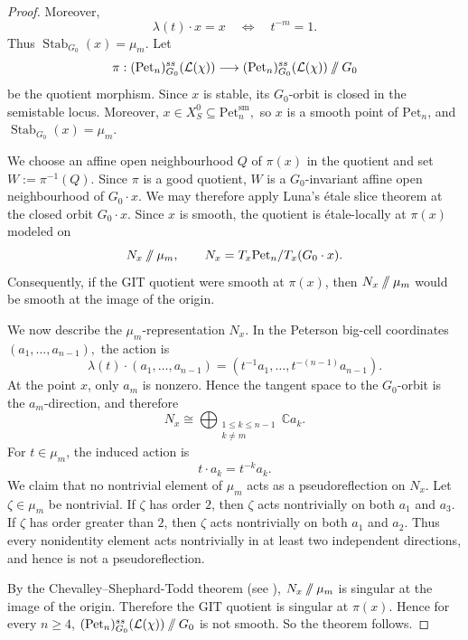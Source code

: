 \documentclass[12pt, reqno]{amsart}
\newcommand{\sslash}{\mathbin{/\mkern-6mu/}}
\theoremstyle{plain}
\numberwithin{equation}{section}
\theoremstyle{definition}
\begin{document}
\begin{proof}
Moreover,
\[
\lambda(t)\cdot x=x
\quad\Longleftrightarrow\quad
t^{-m}=1.
\]
Thus $
\operatorname{Stab}_{G_0}(x)=\mu_m.$ Let
\[
\pi:
(\mathrm{Pet}_n)^{ss}_{G_0}(\mathcal L(\chi))
\longrightarrow
(\mathrm{Pet}_n)^{ss}_{G_0}(\mathcal L(\chi))\sslash G_0
\]
be the quotient morphism. Since \(x\) is stable, its \(G_0\)-orbit is
closed in the semistable locus. Moreover, $x\in X_S^0\subseteq\mathrm{Pet}_n^{\mathrm{sm}},$
so \(x\) is a smooth point of \(\mathrm{Pet}_n\), and $\operatorname{Stab}_{G_0}(x)=\mu_m.$

We choose an affine open neighbourhood \(Q\) of \(\pi(x)\) in the
quotient and set $W:=\pi^{-1}(Q).$
Since \(\pi\) is a good quotient, \(W\) is a \(G_0\)-invariant affine
open neighbourhood of \(G_0\cdot x\). We may therefore apply Luna's
\'etale slice theorem \cite{Luna} at the closed orbit \(G_0\cdot x\).
Since \(x\) is smooth, the quotient is \'etale-locally at \(\pi(x)\)
modeled on
\[
N_x\sslash\mu_m,
\qquad
N_x=
T_x\mathrm{Pet}_n/T_x(G_0\cdot x).
\]
Consequently, if the GIT quotient were smooth at \(\pi(x)\), then
\(N_x\sslash\mu_m\) would be smooth at the image of the origin.

We now describe the $\mu_m$-representation $N_x$. 
In the Peterson big-cell coordinates $(a_1,\ldots,a_{n-1}),$
the action is
\[
\lambda(t)\cdot(a_1,\ldots,a_{n-1})
=
(t^{-1}a_1,\ldots,t^{-(n-1)}a_{n-1}).
\]
At the point \(x\), only \(a_m\) is nonzero. Hence the tangent space
to the \(G_0\)-orbit is the \(a_m\)-direction, and therefore
\[
N_x
\cong
\bigoplus_{\substack{1\le k\le n-1\\k\neq m}}
\mathbb C a_k.
\]
For \(t\in\mu_m\), the induced action is
\[
t\cdot a_k=t^{-k}a_k.
\]
We claim that no nontrivial element of \(\mu_m\) acts as a
pseudoreflection on \(N_x\). Let \(\zeta\in\mu_m\) be nontrivial.
If \(\zeta\) has order \(2\), then \(\zeta\) acts nontrivially on both
\(a_1\) and \(a_3\). If \(\zeta\) has order greater than \(2\), then
\(\zeta\) acts nontrivially on both \(a_1\) and \(a_2\). Thus every
nonidentity element acts nontrivially in at least two independent
directions, and hence is not a pseudoreflection.

By the Chevalley--Shephard-Todd theorem (see \cite[Chapter~18, \S18-1]{Kane}), $
N_x\sslash \mu_m$
is singular at the image of the origin. Therefore the GIT quotient is singular at \(\pi(x)\). Hence for every \(n\ge 4\), $(\mathrm{Pet}_n)^{ss}_{G_0}(\mathcal L(\chi))\sslash G_0$
is not smooth. So the theorem follows.
\end{proof}
\end{document}

